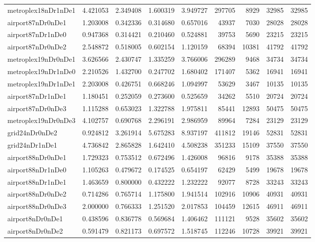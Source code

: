 \documentclass[../../../thesis.tex]{subfiles}
\begin{document}
\begin{longtable}{|l|r|r|r|r|r|r|r|r|}
metroplex18nDr1nDe1 & 4.421053 & 2.349408 & 1.600319 & 3.949727 & 297705 & 8929 & 32985 & 32985 \\
airport87nDr0nDe1 & 1.203008 & 0.342336 & 0.314680 & 0.657016 & 43937 & 7030 & 28028 & 28028 \\
airport87nDr1nDe0 & 0.947368 & 0.314421 & 0.210460 & 0.524881 & 39753 & 5690 & 23215 & 23215 \\
airport87nDr0nDe2 & 2.548872 & 0.518005 & 0.602154 & 1.120159 & 68394 & 10381 & 41792 & 41792 \\
metroplex19nDr0nDe1 & 3.626566 & 2.430747 & 1.335259 & 3.766006 & 296289 & 9468 & 34734 & 34734 \\
metroplex19nDr1nDe0 & 2.210526 & 1.432700 & 0.247702 & 1.680402 & 171407 & 5362 & 16941 & 16941 \\
metroplex19nDr1nDe1 & 2.203008 & 0.426751 & 0.668246 & 1.094997 & 53629 & 3467 & 10135 & 10135 \\
airport87nDr1nDe1 & 1.180451 & 0.252059 & 0.273600 & 0.525659 & 34262 & 5510 & 20724 & 20724 \\
airport87nDr0nDe3 & 1.115288 & 0.653023 & 1.322788 & 1.975811 & 85441 & 12893 & 50475 & 50475 \\
metroplex19nDr0nDe3 & 4.102757 & 0.690768 & 2.296191 & 2.986959 & 89964 & 7284 & 23129 & 23129 \\
grid24nDr0nDe2 & 0.924812 & 3.261914 & 5.675283 & 8.937197 & 411812 & 19146 & 52831 & 52831 \\
grid24nDr1nDe1 & 4.736842 & 2.865828 & 1.642410 & 4.508238 & 351233 & 15109 & 37550 & 37550 \\
airport88nDr0nDe1 & 1.729323 & 0.753512 & 0.672496 & 1.426008 & 96816 & 9178 & 35388 & 35388 \\
airport88nDr1nDe0 & 1.105263 & 0.479672 & 0.174525 & 0.654197 & 62429 & 5499 & 19678 & 19678 \\
airport88nDr1nDe1 & 1.463659 & 0.800000 & 0.432222 & 1.232222 & 92077 & 8728 & 33243 & 33243 \\
airport88nDr0nDe2 & 0.714286 & 0.765714 & 1.175800 & 1.941514 & 102916 & 10906 & 40931 & 40931 \\
airport88nDr0nDe3 & 2.000000 & 0.766333 & 1.251520 & 2.017853 & 104459 & 12615 & 46911 & 46911 \\
airport8nDr0nDe1 & 0.438596 & 0.836778 & 0.569684 & 1.406462 & 111121 & 9528 & 35602 & 35602 \\
airport8nDr0nDe2 & 0.591479 & 0.821173 & 0.697572 & 1.518745 & 112246 & 10728 & 39921 & 39921 \\

\end{longtable}
\end{document}
